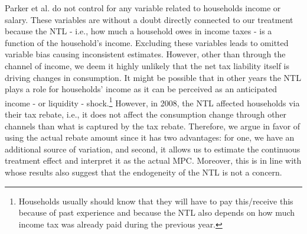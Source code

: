 Parker et al. do not control for any variable related to households income or salary. These variables are without a doubt directly connected to our treatment because the NTL - i.e., how much a household owes in income taxes - is a function of the household's income. Excluding these variables leads to omitted variable bias causing inconsistent estimates. However, other than through the channel of income, we deem it highly unlikely that the net tax liability itself is driving changes in consumption. It might be possible that in other years the NTL plays a role for households' income as it can be perceived as an anticipated income - or liquidity - shock.\footnote{Households usually should know that they will have to pay this/receive this because of past experience and because the NTL also depends on how much income tax was already paid during the previous year.} However, in 2008, the NTL affected households via their tax rebate, i.e., it does not affect the consumption change through other channels than what is captured by the tax rebate. Therefore, we argue in favor of using the actual rebate amount since it has two advantages: for one, we have an additional source of variation, and second, it allows us to estimate the continuous treatment effect and interpret it as the actual MPC. Moreover, this is in line with \cite{misrasurico_2014} whose results also suggest that the endogeneity of the NTL is not a concern.

